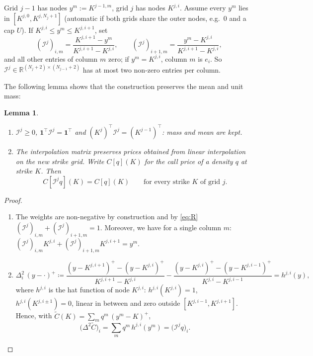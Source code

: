 \documentclass[11pt]{article}
\newcommand{\R}{\mathbb R}
\newcommand{\one}{\mathbf 1}
\theoremstyle{plain}
\newtheorem{lemma}[theorem]{Lemma}
\theoremstyle{definition}
\theoremstyle{remark}
\begin{document}
Grid $j-1$ has nodes $y^m:=K^{j-1,m}$, grid $j$ has nodes $K^{j,i}$. Assume every $y^m$ lies in
$[K^{j,0},K^{j,N_j+1}]$ (automatic if both grids share the outer nodes, e.g.\ $0$ and a cap
$U$). If $K^{j,i}\le y^m\le K^{j,i+1}$, set
\begin{equation}\label{eq:R}
  (\mathcal{I}^j)_{i,m}=\frac{K^{j,i+1}-y^m}{K^{j,i+1}-K^{j,i}},\qquad
  (\mathcal{I}^j)_{i+1,m}=\frac{y^m-K^{j,i}}{K^{j,i+1}-K^{j,i}},
\end{equation}
and all other entries of column $m$ zero; if $y^m=K^{j,i}$, column $m$ is $e_i$. So
$\mathcal{I}^j\in\R^{(N_j+2)\times(N_{j-1}+2)}$ has at most two non-zero entries per column.

The following lemma shows that the construction preserves the mean and unit mass: 
\begin{lemma}\label{lemma:R}
\begin{enumerate}[label=(\roman*)]
\item $\mathcal{I}^j\ge0$, $\one^{\!\top}\mathcal{I}^j=\one^{\!\top}$ and $(K^{j})^{\!\top}\mathcal{I}^j=(K^{j-1})^{\!\top}$:
  mass and mean are kept.
\item The interpolation matrix preserves prices obtained from linear interpolation on the new strike grid. Write $C[q](K)$ for the call price of a density $q$ at strike $K$. Then
  \[
    C[\mathcal{I}^jq](K)=C[q](K)\qquad\text{for every strike $K$ of grid $j$.}
  \]
\end{enumerate}
\end{lemma}
\begin{proof}
  \begin{enumerate}[label=(\roman*)]
    \item The weights are non-negative by construction and by \eqref{eq:R} $(\mathcal{I}^j)_{i, m} + (\mathcal{I}^j)_{i+1, m} = 1$. Moreover, we have for a single column $m$: $(\mathcal{I}^j)_{i, m} K^{j, i} + (\mathcal{I}^j)_{i+1, m} K^{j, i+1} = y^m$. 
    \item \begin{equation*}
  \Delta^2_i\,(y-\cdot)^+
  \coloneqq \frac{(y-K^{j,i+1})^+-(y-K^{j,i})^+}{K^{j,i+1}-K^{j,i}}
          -\frac{(y-K^{j,i})^+-(y-K^{j,i-1})^+}{K^{j,i}-K^{j,i-1}}
  = h^{j,i}(y),
\end{equation*}
where $h^{j,i}$ is the hat function of node $K^{j,i}$: $h^{j,i}(K^{j,i})=1$, $h^{j,i}(K^{j,i\pm1})=0$, linear in between and zero outside $[K^{j,i-1},K^{j,i+1}]$. Hence, with $\tilde C(K)=\sum_m q^m\,(y^m-K)^+$,
\begin{equation*}
  \bigl(\Delta^2\tilde C\bigr)_i=\sum_m q^m\,h^{j,i}(y^m)=\bigl(\mathcal I^j q\bigr)_i .
\end{equation*}

  \end{enumerate}
\end{proof}
\end{document}
